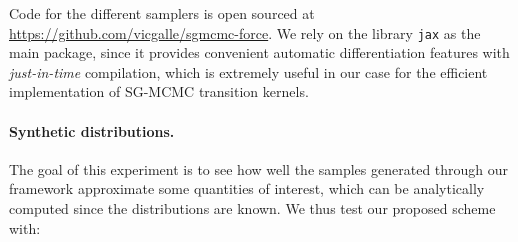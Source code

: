 Code for the different samplers is open sourced at \url{https://github.com/vicgalle/sgmcmc-force}. We rely on the library \texttt{jax} \parencite{jax2018github} as the main package, since it provides convenient automatic differentiation features with \emph{just-in-time} compilation, which is extremely useful in our case for the efficient implementation of SG-MCMC transition kernels.

\paragraph{Synthetic distributions.} 
The goal of this experiment is to see how well the samples generated through our framework approximate some quantities of interest, which can be analytically computed since the distributions are known. We thus test our proposed scheme with:


